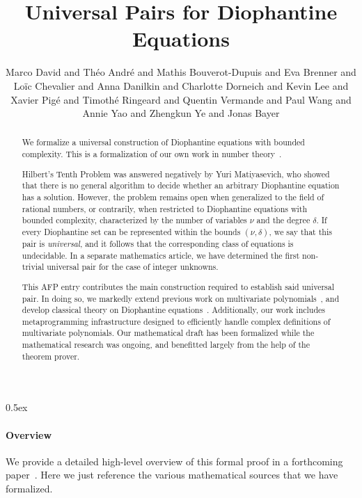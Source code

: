 \documentclass[11pt,a4paper]{article}
\begin{document}
\title{Universal Pairs for Diophantine Equations}

\author{Marco David and Th\'eo Andr\'e and Mathis Bouverot-Dupuis and Eva Brenner and Lo\"ic Chevalier and Anna Danilkin and Charlotte Dorneich and Kevin Lee and Xavier Pig\'e and Timoth\'e Ringeard and Quentin Vermande and Paul Wang and Annie Yao and Zhengkun Ye and Jonas Bayer}
\maketitle


\begin{abstract}
We formalize a universal construction of Diophantine equations with bounded complexity. 
This is a formalization of our own work in number theory~\cite{manuscript}.

Hilbert's Tenth Problem was answered negatively by Yuri Matiyasevich, who showed that there is no 
general algorithm to decide whether an arbitrary Diophantine equation has a solution\cite{matiyasevich-book}. 
However, the 
problem remains open when generalized to the field of rational numbers, or contrarily, when 
restricted to Diophantine equations with bounded complexity, characterized by the number of 
variables $\nu$ and the degree $\delta$. If every Diophantine set can be represented within the 
bounds $(\nu, \delta)$, we say that this pair is \emph{universal}, and it follows that the 
corresponding class of equations is undecidable. In a separate mathematics article, we have 
determined the first non-trivial universal pair for the case of integer unknowns. 

This AFP entry contributes the main construction required to establish said universal pair. In 
doing so, we markedly extend previous work on multivariate polynomials~\cite{polynomials-afp}, 
and develop classical theory on Diophantine equations~\cite{MR75}. Additionally, our work includes 
metaprogramming infrastructure designed to efficiently handle complex definitions of multivariate 
polynomials. Our mathematical draft has been formalized while the mathematical research was 
ongoing, and benefitted largely from the help of the theorem prover. 
\end{abstract}

\tableofcontents

\newpage

\parindent 0pt\parskip 0.5ex

\paragraph{Overview}
We provide a detailed high-level overview of this formal proof in a forthcoming paper~\cite{itp-paper}. 
Here we just reference the various mathematical sources that we have formalized. 
\end{document}
